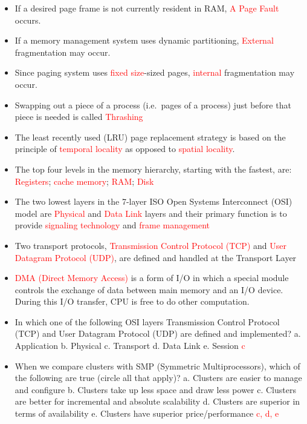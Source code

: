 \documentclass[9pt,landscape]{memoir}
\newcommand{\answer}[1]{\textcolor{red}{#1}}
\begin{document}
\raggedright\footnotesize
\begin{multicols}{6}

\setlength{\premulticols}{1pt}
\setlength{\postmulticols}{1pt}
\setlength{\multicolsep}{1pt}
\setlength{\columnsep}{2pt}
\tiny

\begin{itemize}
    \item If a desired page frame is not currently resident in RAM, \answer{A Page Fault} occurs.
    \item If a memory management system uses dynamic partitioning, \answer{External} fragmentation may occur.
    \item Since paging system uses \answer{fixed size}-sized pages, \answer{internal} fragmentation may occur.
    \item Swapping out a piece of a process (i.e.~pages of a process) just before that piece is needed is called \answer{Thrashing}
    \item The least recently used (LRU) page replacement strategy is based on the principle of \answer{temporal locality}  as opposed to \answer{spatial locality}.
    \item The top four levels in the memory hierarchy, starting with the fastest, are: \answer{Registers}; \answer{cache memory}; \answer{RAM}; \answer{Disk}
    \item The two lowest layers in the 7-layer ISO Open Systems Interconnect (OSI) model are \answer{Physical} and \answer{Data Link}  layers and their primary function is to provide \answer{signaling technology} and \answer{frame management}
    \item Two transport protocols, \answer{Transmission Control Protocol (TCP)} and \answer{User Datagram Protocol (UDP)}, are defined and handled at the Transport Layer
    \item \answer{DMA (Direct Memory Access)} is a form of I/O in which a special module controls the exchange of data between main memory and an I/O device. During this I/O transfer, CPU is free to do other computation.
    \item In which one of the following OSI layers Transmission Control Protocol (TCP) and User Datagram Protocol (UDP) are defined and implemented? a. Application b. Physical c. Transport d. Data Link e. Session \answer{c}
    \item When we compare clusters with SMP (Symmetric Multiprocessors), which of the following are true (circle all that apply)? a. Clusters are easier to manage and configure b. Clusters take up less space and draw less power c. Clusters are better for incremental and absolute scalability d. Clusters are superior in terms of availability e. Clusters have superior price/performance \answer{c, d, e}

\end{itemize}
\end{multicols}
\end{document}
